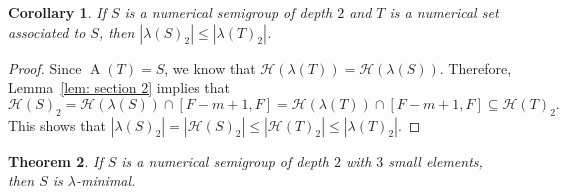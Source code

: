 \documentclass{amsproc}
\DeclareMathOperator{\A}{A}
\newtheorem{theorem}{Theorem}[section]
\newtheorem{corollary}[theorem]{Corollary}
\theoremstyle{definition}
\theoremstyle{remark}
\numberwithin{equation}{section}
\begin{document}
\begin{corollary}\label{cor: section 2}
If $S$ is a numerical semigroup of depth $2$ and $T$ is a numerical set associated to $S$, then $|\lambda(S)_2|\leq |\lambda(T)_2|$.
\end{corollary}
\begin{proof}
Since $\A(T)=S$, we know that $\mathcal{H}(\lambda(T))=\mathcal{H}(\lambda(S))$. Therefore, Lemma~\ref{lem: section 2} implies that
\[\mathcal{H}(S)_2= \mathcal{H}(\lambda(S)) \cap [F-m+1,F] = \mathcal{H}(\lambda(T)) \cap [F-m+1,F] \subseteq \mathcal{H}(T)_2.\]
This shows that $|\lambda(S)_2|= |\mathcal{H}(S)_2|\leq |\mathcal{H}(T)_2|\leq |\lambda(T)_2|$.
\end{proof}






\begin{theorem}
    If $S$ is a numerical semigroup of depth $2$ with $3$ small elements, then $S$ is $\lambda$-minimal.
\end{theorem}
\end{document}
